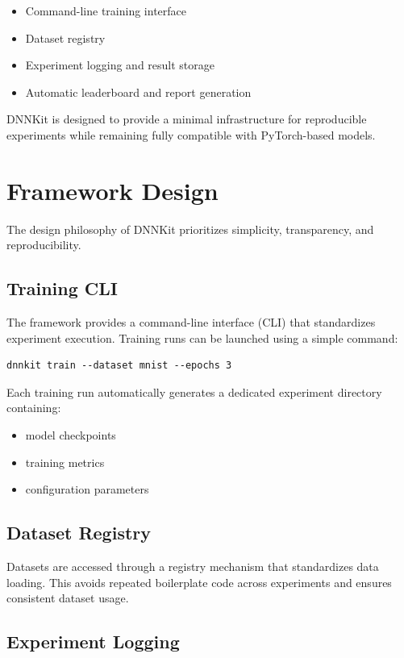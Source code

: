 \documentclass{article}
\begin{document}
\begin{itemize}
\item Command-line training interface
\item Dataset registry
\item Experiment logging and result storage
\item Automatic leaderboard and report generation
\end{itemize}

DNNKit is designed to provide a minimal infrastructure for reproducible experiments
while remaining fully compatible with PyTorch-based models.

\section{Framework Design}

The design philosophy of DNNKit prioritizes simplicity, transparency, and reproducibility.

\subsection{Training CLI}

The framework provides a command-line interface (CLI) that standardizes experiment execution.
Training runs can be launched using a simple command:

\begin{verbatim}
dnnkit train --dataset mnist --epochs 3
\end{verbatim}

Each training run automatically generates a dedicated experiment directory containing:

\begin{itemize}
\item model checkpoints
\item training metrics
\item configuration parameters
\end{itemize}

\subsection{Dataset Registry}

Datasets are accessed through a registry mechanism that standardizes data loading.
This avoids repeated boilerplate code across experiments and ensures consistent dataset usage.

\subsection{Experiment Logging}
\end{document}
